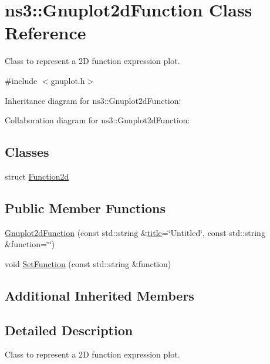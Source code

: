 \hypertarget{classns3_1_1Gnuplot2dFunction}{}\section{ns3\+:\+:Gnuplot2d\+Function Class Reference}
\label{classns3_1_1Gnuplot2dFunction}


Class to represent a 2D function expression plot.  




{\ttfamily \#include $<$gnuplot.\+h$>$}



Inheritance diagram for ns3\+:\+:Gnuplot2d\+Function\+:


Collaboration diagram for ns3\+:\+:Gnuplot2d\+Function\+:
\subsection*{Classes}
\begin{DoxyCompactItemize}
\item 
struct \hyperlink{structns3_1_1Gnuplot2dFunction_1_1Function2d}{Function2d}
\end{DoxyCompactItemize}
\subsection*{Public Member Functions}
\begin{DoxyCompactItemize}
\item 
\hyperlink{classns3_1_1Gnuplot2dFunction_ab10ba57a192268ecd35d778d46808b34}{Gnuplot2d\+Function} (const std\+::string \&\hyperlink{lte__link__budget__x2__handover__measures_8m_a3f4b991df405379f6917e1683ed5a8c8}{title}=\char`\"{}Untitled\char`\"{}, const std\+::string \&function=\char`\"{}\char`\"{})
\item 
void \hyperlink{classns3_1_1Gnuplot2dFunction_a261d7463c72a95de836a28a4ededc6f8}{Set\+Function} (const std\+::string \&function)
\end{DoxyCompactItemize}
\subsection*{Additional Inherited Members}


\subsection{Detailed Description}
Class to represent a 2D function expression plot. 

